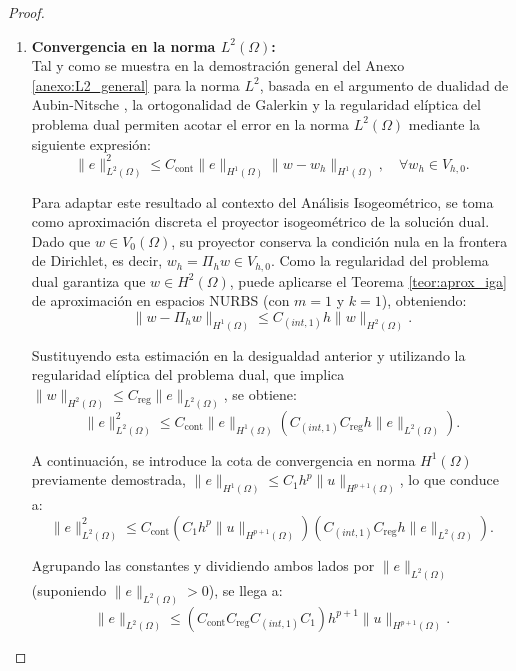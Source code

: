 \documentclass[11pt]{book}
\theoremstyle{plain} %
\theoremstyle{definition} %
\theoremstyle{definition} %
\begin{document}
\begin{proof}
\begin{enumerate}
        \item \textbf{Convergencia en la norma $L^2(\Omega)$:} \\
        Tal y como se muestra en la demostración general del Anexo \ref{anexo:L2_general} para la norma $L^2$, basada en el argumento de dualidad de Aubin-Nitsche \cite{ciarlet_finite_2002}, la ortogonalidad de Galerkin y la regularidad elíptica del problema dual permiten acotar el error en la norma $L^2(\Omega)$ mediante la siguiente expresión:
        \begin{equation*}
            \|e\|_{L^2(\Omega)}^2 \leq C_{\text{cont}} \|e\|_{H^1(\Omega)} \|w - w_h\|_{H^1(\Omega)}, \quad \forall w_h \in V_{h,0}.
        \end{equation*}

        Para adaptar este resultado al contexto del Análisis Isogeométrico, se toma como aproximación discreta el proyector isogeométrico de la solución dual. Dado que $w \in V_0(\Omega)$, su proyector conserva la condición nula en la frontera de Dirichlet, es decir, $w_h = \Pi_h w \in V_{h,0}$. Como la regularidad del problema dual garantiza que $w \in H^2(\Omega)$, puede aplicarse el Teorema \ref{teor:aprox_iga} de aproximación en espacios NURBS (con $m=1$ y $k=1$), obteniendo:
        \begin{equation*}
            \|w - \Pi_h w\|_{H^1(\Omega)} \leq C_{(int, 1)} h \|w\|_{H^2(\Omega)}.
        \end{equation*}

        Sustituyendo esta estimación en la desigualdad anterior y utilizando la regularidad elíptica del problema dual, que implica $\|w\|_{H^2(\Omega)} \leq C_{\text{reg}} \|e\|_{L^2(\Omega)}$, se obtiene:
        \begin{equation*}
            \|e\|_{L^2(\Omega)}^2 \leq C_{\text{cont}} \|e\|_{H^1(\Omega)} \left( C_{(int, 1)} C_{\text{reg}} h \|e\|_{L^2(\Omega)} \right).
        \end{equation*}

        A continuación, se introduce la cota de convergencia en norma $H^1(\Omega)$ previamente demostrada, $\|e\|_{H^1(\Omega)} \leq C_1 h^p \|u\|_{H^{p+1}(\Omega)}$, lo que conduce a:
        \begin{equation*}
            \|e\|_{L^2(\Omega)}^2 \leq C_{\text{cont}} \left( C_1 h^p \|u\|_{H^{p+1}(\Omega)} \right) \left( C_{(int, 1)} C_{\text{reg}} h \|e\|_{L^2(\Omega)} \right).
        \end{equation*}

        Agrupando las constantes y dividiendo ambos lados por $\|e\|_{L^2(\Omega)}$ (suponiendo $\|e\|_{L^2(\Omega)} > 0$), se llega a:
        \begin{equation*}
            \|e\|_{L^2(\Omega)} \leq \left( C_{\text{cont}} C_{\text{reg}} C_{(int, 1)} C_1 \right) h^{p+1} \|u\|_{H^{p+1}(\Omega)}.
        \end{equation*}


\end{enumerate}
\end{proof}
\end{document}

